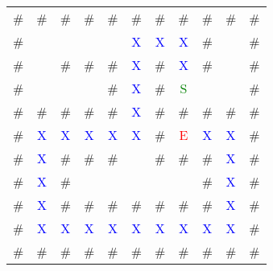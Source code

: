 {\ttfamily
\setlength{\tabcolsep}{0.5em}
\setlength{\arraystretch}{0.8}
\begin{tabular}{ccccccccccc}
\# & \# & \# & \# & \# & \# & \# & \# & \# & \# & \# \\
\# &   &   &   &   & \textcolor{blue}{X} & \textcolor{blue}{X} & \textcolor{blue}{X} & \# &  & \# \\
\# &   & \# & \# & \# & \textcolor{blue}{X} & \# & \textcolor{blue}{X} & \# &   & \# \\
\# &   &   &   & \# & \textcolor{blue}{X} & \# & \textcolor{green}{S} &   &   & \# \\
\# & \# & \# & \# & \# & \textcolor{blue}{X} & \# & \# & \# & \# & \# \\
\# & \textcolor{blue}{X} & \textcolor{blue}{X} & \textcolor{blue}{X} & \textcolor{blue}{X} & \textcolor{blue}{X} & \# & \textcolor{red}{E} & \textcolor{blue}{X} & \textcolor{blue}{X} & \# \\
\# & \textcolor{blue}{X} & \# & \# & \# &   & \# & \# & \# & \textcolor{blue}{X} & \# \\
\# & \textcolor{blue}{X} & \# &   &   &   &   &   & \# & \textcolor{blue}{X} & \# \\
\# & \textcolor{blue}{X} & \# & \# & \# & \# & \# & \# & \# & \textcolor{blue}{X} & \# \\
\# & \textcolor{blue}{X} & \textcolor{blue}{X} & \textcolor{blue}{X} & \textcolor{blue}{X} & \textcolor{blue}{X} & \textcolor{blue}{X} & \textcolor{blue}{X} & \textcolor{blue}{X} & \textcolor{blue}{X} & \# \\
\# & \# & \# & \# & \# & \# & \# & \# & \# & \# & \#
\end{tabular}
}